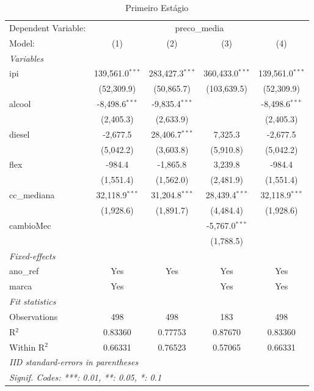 \documentclass{article}
\begin{document}
\begin{table}[H]
\begingroup
\centering
\begin{tabular}{lcccc}
   \tabularnewline \midrule \midrule
   Dependent Variable: & \multicolumn{4}{c}{preco\_media}\\
   Model:       & (1)               & (2)               & (3)               & (4)\\  
   \midrule
   \emph{Variables}\\
   ipi          & 139,561.0$^{***}$ & 283,427.3$^{***}$ & 360,433.0$^{***}$ & 139,561.0$^{***}$\\   
                & (52,309.9)        & (50,865.7)        & (103,639.5)       & (52,309.9)\\   
   alcool       & -8,498.6$^{***}$  & -9,835.4$^{***}$  &                   & -8,498.6$^{***}$\\   
                & (2,405.3)         & (2,633.9)         &                   & (2,405.3)\\   
   diesel       & -2,677.5          & 28,406.7$^{***}$  & 7,325.3           & -2,677.5\\   
                & (5,042.2)         & (3,603.8)         & (5,910.8)         & (5,042.2)\\   
   flex         & -984.4            & -1,865.8          & 3,239.8           & -984.4\\   
                & (1,551.4)         & (1,562.0)         & (2,481.9)         & (1,551.4)\\   
   cc\_mediana  & 32,118.9$^{***}$  & 31,204.8$^{***}$  & 28,439.4$^{***}$  & 32,118.9$^{***}$\\   
                & (1,928.6)         & (1,891.7)         & (4,484.4)         & (1,928.6)\\   
   cambioMec    &                   &                   & -5,767.0$^{***}$  &   \\   
                &                   &                   & (1,788.5)         &   \\   
   \midrule
   \emph{Fixed-effects}\\
   ano\_ref     & Yes               & Yes               & Yes               & Yes\\  
   marca        & Yes               &                   & Yes               & Yes\\  
   \midrule
   \emph{Fit statistics}\\
   Observations & 498               & 498               & 183               & 498\\  
   R$^2$        & 0.83360           & 0.77753           & 0.87670           & 0.83360\\  
   Within R$^2$ & 0.66331           & 0.76523           & 0.57065           & 0.66331\\  
   \midrule \midrule
   \multicolumn{5}{l}{\emph{IID standard-errors in parentheses}}\\
   \multicolumn{5}{l}{\emph{Signif. Codes: ***: 0.01, **: 0.05, *: 0.1}}\\
\end{tabular}
\par\endgroup
    \caption{Primeiro Estágio}
    \label{tab:1es}
\end{table}
\end{document}

